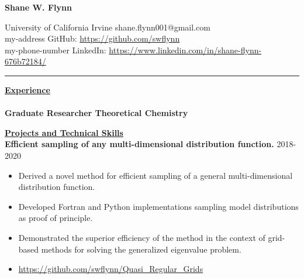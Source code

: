 \documentclass[letterpaper]{article}
\def\name{Shane W. Flynn}
\begin{document}
\centerline{\huge \textbf{\name}}
\vspace{0.1in}
University of California Irvine \hfill shane.flynn001@gmail.com \\
my-address \hfill GitHub: \url{https://github.com/swflynn}\\
my-phone-number \hfill LinkedIn: \url{https://www.linkedin.com/in/shane-flynn-676b72184/}
\hrule
\vspace{0.15in}
{\large \textbf{\underline{Experience}}}\\
\vspace{-0.1in}\\
\textbf{Graduate Researcher Theoretical Chemistry}





\vspace{0.1in}
{\large \textbf{\underline{Projects and Technical Skills}}}\\

\textbf{Efficient sampling of any multi-dimensional distribution function.}
\hfill 2018-2020
\begin{itemize}
    \item Derived a novel method for efficient sampling of a general
    multi-dimensional distribution function.
    \item Developed Fortran and Python implementations sampling model
    distributions as proof of principle.
    \item Demonstrated the superior efficiency of the method in the context of
    grid-based methods for solving the generalized eigenvalue problem.
    \item \url{https://github.com/swflynn/Quasi_Regular_Grids}
\end{itemize}
\end{document}
